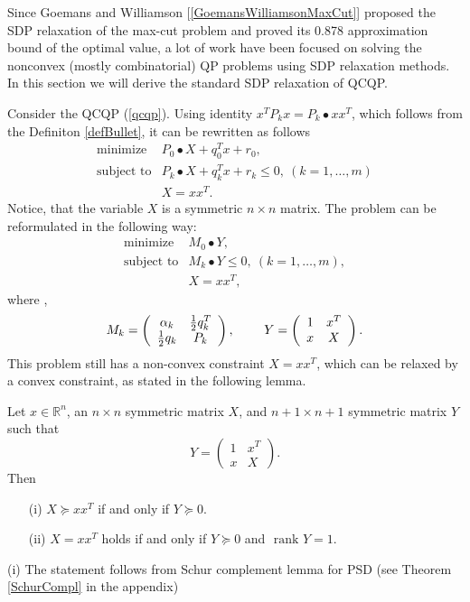 \documentclass[12pt]{book}
\theoremstyle{definition}
\begin{document}
Since Goemans and Williamson [\ref{GoemansWilliamsonMaxCut}] proposed the SDP relaxation of the max-cut problem and proved its 0.878 approximation bound of the optimal value, a lot of work have been focused on solving the nonconvex (mostly combinatorial) QP problems using SDP relaxation methods. In this section we will derive the standard SDP relaxation of QCQP. 




Consider the QCQP (\ref{qcqp}). Using identity $x^TP_kx = P_k\bullet xx^T$, which follows from the Definiton \ref{defBullet}, it can be rewritten as follows
\begin{equation} 
\label{1stStepToSDPr}
\begin{array}{ll}
\mbox{minimize}& P_0\bullet X + q_0^Tx +r_0, \\
\mbox{subject to}& P_k\bullet X+ q_k^Tx + r_k  \leq 0, \  (k = 1,\dots ,m)\\
& X = xx^T.
\end{array} 
\end{equation}
Notice, that the variable $X$ is a symmetric $n\times n$ matrix. 
 The problem can be reformulated in the following way:
 \begin{equation} 
\label{2ndStepToSDPr}
\begin{array}{ll}
\mbox{minimize}& M_0\bullet Y, \\
\mbox{subject to}& M_k\bullet Y \leq 0, \  (k = 1,\dots ,m),\\
& X = xx^T,
\end{array} 
\end{equation}
 where , 
\begin{equation}
M_k = \left(
\begin{array}{cc}
\alpha_k & {1\over 2}q_k^T \\
{1\over 2}q_k & P_k
\end{array}\right), 
\ \ \ \ \ \ \
Y =  \left(
\begin{array}{cc}
1 & x^T \\
x & X
\end{array}\right).
\end{equation}
 This problem still has a non-convex constraint $X = xx^T$, which can be relaxed by a convex constraint, as stated in the following lemma.
  
\lema 
\label{relaxRank1Lemma}
Let $x\in \mathbb{R}^n$, an $n\times n$ symmetric matrix $X$, and $n+1\times n+1$ symmetric matrix $Y$ such that 
$$Y =  \left(
\begin{array}{cc}
1 & x^T \\
x & X
\end{array}\right). 
$$  Then
\begin{itemize}
\item[(i)] $X\succeq xx^T$ if and only if $Y\succeq 0$.
\item[(ii)] $X=xx^T$ holds if and only if $Y\succeq 0$ and \rm $\mbox{ rank } Y=1$. 
\end{itemize}
\proof (i) The statement follows from Schur complement lemma for PSD (see Theorem \ref{SchurCompl} in the appendix) 
\end{document}
